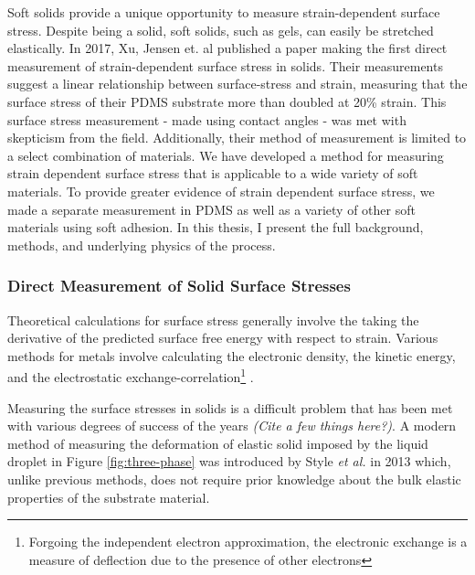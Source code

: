 Soft solids provide a unique opportunity to measure strain-dependent surface stress. Despite being a solid, soft solids, such as gels, can easily be stretched elastically. In 2017, Xu, Jensen et. al published a paper \cite{xu2017direct} making the first direct measurement of strain-dependent surface stress in solids. Their measurements suggest a linear relationship between surface-stress and strain, measuring that the surface stress of their PDMS substrate more than doubled at 20\% strain. This surface stress measurement - made using contact angles - was met with skepticism from the field. Additionally, their method of measurement is limited to a select combination of materials. We have developed a method for measuring strain dependent surface stress that is applicable to a wide variety of soft materials. To provide greater evidence of strain dependent surface stress, we made a separate measurement in PDMS as well as a variety of other soft materials using soft adhesion. In this thesis, I present the full background, methods, and underlying physics of the process.    



\subsubsection{Direct Measurement of Solid Surface Stresses}
Theoretical calculations for surface stress generally involve the taking the derivative of the predicted surface free energy with respect to strain. Various methods for metals involve calculating the electronic density, the kinetic energy, and the electrostatic exchange-correlation\footnote{Forgoing the independent electron approximation, the electronic exchange is a measure of deflection due to the presence of other electrons} \cite{GURTIN1978431}. 
 
Measuring the surface stresses in solids is a difficult problem that has been met with various degrees of success of the years \emph{(Cite a few things here?)}. A modern method of measuring the deformation of elastic solid imposed by the liquid droplet in Figure \ref{fig:three-phase} was introduced by Style \emph{et al.} in 2013 \cite{style2013universal} which, unlike previous methods, does not require prior knowledge about the bulk elastic properties of the substrate material.

